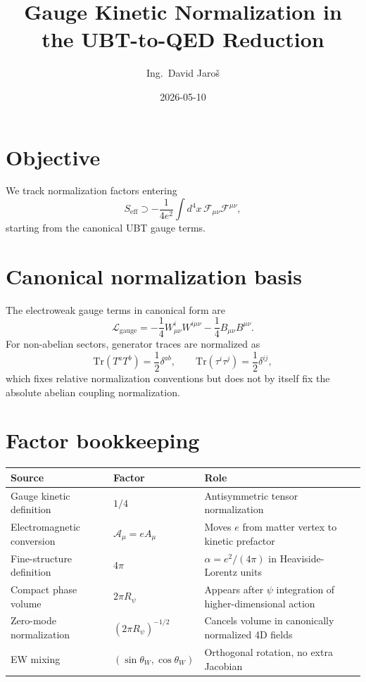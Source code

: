 \documentclass[11pt,a4paper]{article}
\title{Gauge Kinetic Normalization in the UBT-to-QED Reduction}
\author{Ing.\ David Jaroš}
\date{2026-05-10}
\begin{document}
\maketitle

\section{Objective}
We track normalization factors entering
\begin{equation}
S_{\mathrm{eff}}\supset -\frac{1}{4e^2}\int d^4x\,\mathcal{F}_{\mu\nu}\mathcal{F}^{\mu\nu},
\end{equation}
starting from the canonical UBT gauge terms.

\section{Canonical normalization basis}
The electroweak gauge terms in canonical form are
\begin{equation}
\mathcal{L}_{\mathrm{gauge}}=-\frac14 W^i_{\mu\nu}W^{i\mu\nu}-\frac14 B_{\mu\nu}B^{\mu\nu}.
\end{equation}
For non-abelian sectors, generator traces are normalized as
\begin{equation}
\mathrm{Tr}(T^aT^b)=\frac12\delta^{ab},\qquad
\mathrm{Tr}(\tau^i\tau^j)=\frac12\delta^{ij},
\end{equation}
which fixes relative normalization conventions but does not by itself fix the absolute
abelian coupling normalization.

\section{Factor bookkeeping}
\begin{center}
\begin{tabular}{@{}lll@{}}
\toprule
Source & Factor & Role \\
\midrule
Gauge kinetic definition & $1/4$ & Antisymmetric tensor normalization \\
Electromagnetic conversion & $\mathcal{A}_\mu=eA_\mu$ & Moves $e$ from matter vertex to kinetic prefactor \\
Fine-structure definition & $4\pi$ & $\alpha=e^2/(4\pi)$ in Heaviside-Lorentz units \\
Compact phase volume & $2\pi R_\psi$ & Appears after $\psi$ integration of higher-dimensional action \\
Zero-mode normalization & $(2\pi R_\psi)^{-1/2}$ & Cancels volume in canonically normalized 4D fields \\
EW mixing & $(\sin\theta_W,\cos\theta_W)$ & Orthogonal rotation, no extra Jacobian \\
\bottomrule
\end{tabular}
\end{center}
\end{document}
